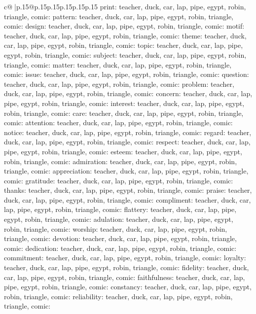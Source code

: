 \documentclass{article}
\begin{document}
{\begin{supertabular}{c@{$\;$}|p{.15\linewidth}@{}p{.15\linewidth}p{.15\linewidth}p{.15\linewidth}p{.15\linewidth}p{.15\linewidth}}
{{{print\nTARGETS: teacher, duck, car, lap, pipe, egypt, robin, triangle, comic\n\nCLUE: pattern\nTARGETS: teacher, duck, car, lap, pipe, egypt, robin, triangle, comic\n\nCLUE: design\nTARGETS: teacher, duck, car, lap, pipe, egypt, robin, triangle, comic\n\nCLUE: motif\nTARGETS: teacher, duck, car, lap, pipe, egypt, robin, triangle, comic\n\nCLUE: theme\nTARGETS: teacher, duck, car, lap, pipe, egypt, robin, triangle, comic\n\nCLUE: topic\nTARGETS: teacher, duck, car, lap, pipe, egypt, robin, triangle, comic\n\nCLUE: subject\nTARGETS: teacher, duck, car, lap, pipe, egypt, robin, triangle, comic\n\nCLUE: matter\nTARGETS: teacher, duck, car, lap, pipe, egypt, robin, triangle, comic\n\nCLUE: issue\nTARGETS: teacher, duck, car, lap, pipe, egypt, robin, triangle, comic\n\nCLUE: question\nTARGETS: teacher, duck, car, lap, pipe, egypt, robin, triangle, comic\n\nCLUE: problem\nTARGETS: teacher, duck, car, lap, pipe, egypt, robin, triangle, comic\n\nCLUE: concern\nTARGETS: teacher, duck, car, lap, pipe, egypt, robin, triangle, comic\n\nCLUE: interest\nTARGETS: teacher, duck, car, lap, pipe, egypt, robin, triangle, comic\n\nCLUE: care\nTARGETS: teacher, duck, car, lap, pipe, egypt, robin, triangle, comic\n\nCLUE: attention\nTARGETS: teacher, duck, car, lap, pipe, egypt, robin, triangle, comic\n\nCLUE: notice\nTARGETS: teacher, duck, car, lap, pipe, egypt, robin, triangle, comic\n\nCLUE: regard\nTARGETS: teacher, duck, car, lap, pipe, egypt, robin, triangle, comic\n\nCLUE: respect\nTARGETS: teacher, duck, car, lap, pipe, egypt, robin, triangle, comic\n\nCLUE: esteem\nTARGETS: teacher, duck, car, lap, pipe, egypt, robin, triangle, comic\n\nCLUE: admiration\nTARGETS: teacher, duck, car, lap, pipe, egypt, robin, triangle, comic\n\nCLUE: appreciation\nTARGETS: teacher, duck, car, lap, pipe, egypt, robin, triangle, comic\n\nCLUE: gratitude\nTARGETS: teacher, duck, car, lap, pipe, egypt, robin, triangle, comic\n\nCLUE: thanks\nTARGETS: teacher, duck, car, lap, pipe, egypt, robin, triangle, comic\n\nCLUE: praise\nTARGETS: teacher, duck, car, lap, pipe, egypt, robin, triangle, comic\n\nCLUE: compliment\nTARGETS: teacher, duck, car, lap, pipe, egypt, robin, triangle, comic\n\nCLUE: flattery\nTARGETS: teacher, duck, car, lap, pipe, egypt, robin, triangle, comic\n\nCLUE: adulation\nTARGETS: teacher, duck, car, lap, pipe, egypt, robin, triangle, comic\n\nCLUE: worship\nTARGETS: teacher, duck, car, lap, pipe, egypt, robin, triangle, comic\n\nCLUE: devotion\nTARGETS: teacher, duck, car, lap, pipe, egypt, robin, triangle, comic\n\nCLUE: dedication\nTARGETS: teacher, duck, car, lap, pipe, egypt, robin, triangle, comic\n\nCLUE: commitment\nTARGETS: teacher, duck, car, lap, pipe, egypt, robin, triangle, comic\n\nCLUE: loyalty\nTARGETS: teacher, duck, car, lap, pipe, egypt, robin, triangle, comic\n\nCLUE: fidelity\nTARGETS: teacher, duck, car, lap, pipe, egypt, robin, triangle, comic\n\nCLUE: faithfulness\nTARGETS: teacher, duck, car, lap, pipe, egypt, robin, triangle, comic\n\nCLUE: constancy\nTARGETS: teacher, duck, car, lap, pipe, egypt, robin, triangle, comic\n\nCLUE: reliability\nTARGETS: teacher, duck, car, lap, pipe, egypt, robin, triangle, comic\n\nCLUE: }}}
\end{supertabular}}
\end{document}
